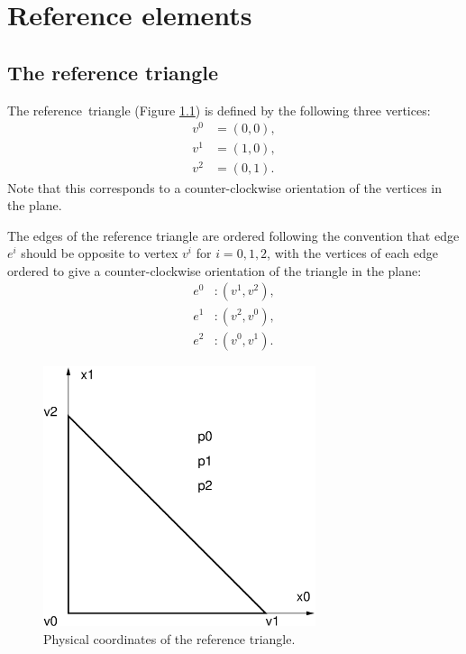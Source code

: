 \chapter{Reference elements}

\section{The reference triangle}

The reference~triangle (Figure \ref{fig:reference_triangle})
is defined by the following three vertices:
\begin{equation}
  \begin{split}
    v^0 &= (0,0), \\
    v^1 &= (1,0), \\
    v^2 &= (0,1).
  \end{split}
\end{equation}
Note that this corresponds to a counter-clockwise orientation of the vertices in the plane.

The edges of the reference triangle are ordered following the convention that edge $e^i$ should be
opposite to vertex $v^i$ for $i=0,1,2$, with the vertices of each edge ordered to give a
counter-clockwise orientation of the triangle in the plane:
\begin{equation}
  \begin{split}
    e^0 &: (v^1, v^2), \\
    e^1 &: (v^2, v^0), \\
    e^2 &: (v^0, v^1).
  \end{split}
\end{equation}

\begin{figure}[htbp]
  \begin{center}
    \includegraphics[width=8cm]{eps/reference_triangle.eps}
    \caption{Physical coordinates of the reference triangle.}
    \label{fig:reference_triangle}
  \end{center}
\end{figure}


